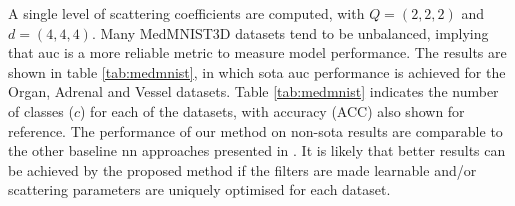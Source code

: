\documentclass[journal]{IEEEtran}
\begin{document}
A single level of scattering coefficients are computed, with $Q = (2, 2, 2)$ and $d = (4, 4, 4)$. Many MedMNIST3D datasets tend to be unbalanced, implying that \ac{auc} is a more reliable metric to measure model performance. The results are shown in table \ref{tab:medmnist}, in which \ac{sota} \ac{auc} performance is achieved for the Organ, Adrenal and Vessel datasets. Table \ref{tab:medmnist} indicates the number of classes ($c$) for each of the datasets, with accuracy (ACC) also shown for reference. The performance of our method on non-\ac{sota} results are comparable to the other baseline \ac{nn} approaches presented in \cite{medmnist}. It is likely that better results can be achieved by the proposed method if the filters are made learnable and/or scattering parameters are uniquely optimised for each dataset.




\newpage
 
 
\end{document}
